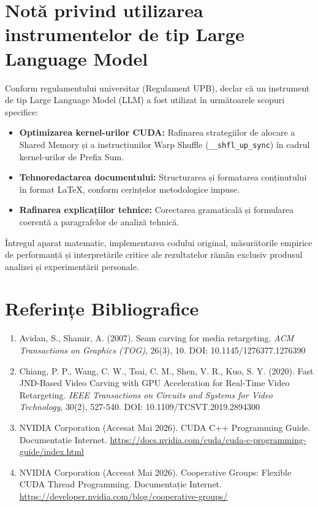 \documentclass[12pt,a4paper]{article}
\begin{document}
\section{Notă privind utilizarea instrumentelor de tip Large Language Model}
Conform regulamentului universitar (Regulament UPB), declar că un instrument de tip Large Language Model (LLM) a fost utilizat în următoarele scopuri specifice:
\begin{itemize}[noitemsep]
    \item \textbf{Optimizarea kernel-urilor CUDA:} Rafinarea strategiilor de alocare a Shared Memory și a instrucțiunilor Warp Shuffle (\texttt{\_\_shfl\_up\_sync}) în cadrul kernel-urilor de Prefix Sum.
    \item \textbf{Tehnoredactarea documentului:} Structurarea și formatarea conținutului în format LaTeX, conform cerințelor metodologice impuse.
    \item \textbf{Rafinarea explicațiilor tehnice:} Corectarea gramaticală și formularea coerentă a paragrafelor de analiză tehnică.
\end{itemize}
Întregul aparat matematic, implementarea codului original, măsurătorile empirice de performanță și interpretările critice ale rezultatelor rămân exclusiv produsul analizei și experimentării personale.
\newpage
\section{Referințe Bibliografice}
\begin{enumerate}
    \item Avidan, S., Shamir, A. (2007). Seam carving for media retargeting. \textit{ACM Transactions on Graphics (TOG)}, 26(3), 10. DOI: 10.1145/1276377.1276390
    \item Chiang, P. P., Wang, C. W., Tsai, C. M., Shen, V. R., Kuo, S. Y. (2020). Fast JND-Based Video Carving with GPU Acceleration for Real-Time Video Retargeting. \textit{IEEE Transactions on Circuits and Systems for Video Technology}, 30(2), 527-540. DOI: 10.1109/TCSVT.2019.2894300
    \item NVIDIA Corporation (Accesat Mai 2026). CUDA C++ Programming Guide. Documentație Internet. \url{https://docs.nvidia.com/cuda/cuda-c-programming-guide/index.html}
    \item NVIDIA Corporation (Accesat Mai 2026). Cooperative Groups: Flexible CUDA Thread Programming. Documentație Internet. \url{https://developer.nvidia.com/blog/cooperative-groups/}
\end{enumerate}
\end{document}
